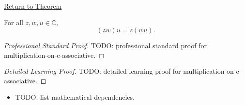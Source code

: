 \newpage
{}
\label{prf:multiplication-on-c-associative}

\begin{remark*}[Return]
\hyperref[thm:multiplication-on-c-associative]{Return to Theorem}
\end{remark*}

\begin{theorem*}
For all \(z,w,u\in\mathbb{C}\),
\[
(zw)u=z(wu).
\]
\end{theorem*}

\begin{proof}[Professional Standard Proof]
\LRAProofBodyStart
TODO: professional standard proof for multiplication-on-c-associative.
\end{proof}

\begin{proof}[Detailed Learning Proof]
\LRAProofBodyStart
TODO: detailed learning proof for multiplication-on-c-associative.
\end{proof}

\begin{remark*}
\end{remark*}

\begin{dependencies}
\begin{itemize}
  \item TODO: list mathematical dependencies.
\end{itemize}
\end{dependencies}

\clearpage
